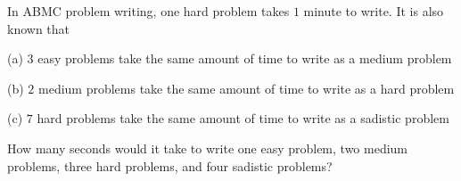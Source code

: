 In ABMC problem writing, one hard problem takes $1$ minute to write. It is also known that

(a) $3$ easy problems take the same amount of time to write as a medium problem

(b) $2$ medium problems take the same amount of time to write as a hard problem

(c) $7$ hard problems take the same amount of time to write as a sadistic problem

How many seconds would it take to write one easy problem, two medium problems, three hard problems, and four sadistic problems?
